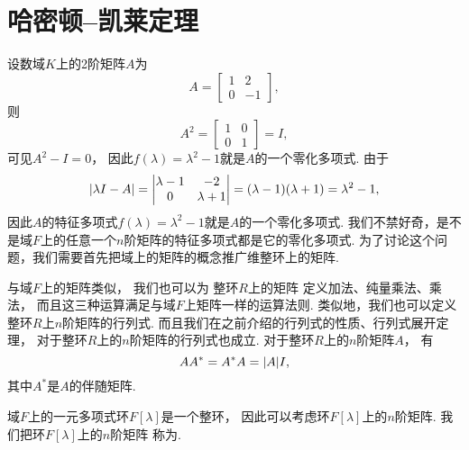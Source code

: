 \section{哈密顿--凯莱定理}
设数域\(K\)上的2阶矩阵\(A\)为\[
	A = \begin{bmatrix}
		1 & 2 \\
		0 & -1
	\end{bmatrix},
\]
则\[
	A^2
	= \begin{bmatrix}
		1 & 0 \\
		0 & 1
	\end{bmatrix}
	= I,
\]
可见\(A^2 - I = 0\)，
因此\(f(\lambda) = \lambda^2 - 1\)就是\(A\)的一个零化多项式.
由于\[
	\abs{\lambda I - A}
	= \begin{vmatrix}
		\lambda-1 & -2 \\
		0 & \lambda+1
	\end{vmatrix}
	= (\lambda-1)(\lambda+1)
	= \lambda^2-1,
\]
因此\(A\)的特征多项式\(f(\lambda) = \lambda^2-1\)就是\(A\)的一个零化多项式.
我们不禁好奇，是不是域\(F\)上的任意一个\(n\)阶矩阵的特征多项式都是它的零化多项式.
为了讨论这个问题，我们需要首先把域上的矩阵的概念推广维整环上的矩阵.

与域\(F\)上的矩阵类似，
我们也可以为
整环\(R\)上的矩阵
定义加法、纯量乘法、乘法，
而且这三种运算满足与域\(F\)上矩阵一样的运算法则.
类似地，我们也可以定义整环\(R\)上\(n\)阶矩阵的行列式.
而且我们在之前介绍的行列式的性质、行列式展开定理，
对于整环\(R\)上的\(n\)阶矩阵的行列式也成立.
对于整环\(R\)上的\(n\)阶矩阵\(A\)，
有\[
	A A^* = A^* A = \abs{A} I,
\]
其中\(A^*\)是\(A\)的伴随矩阵.

域\(F\)上的一元多项式环\(F[\lambda]\)是一个整环，
因此可以考虑环\(F[\lambda]\)上的\(n\)阶矩阵.
我们把环\(F[\lambda]\)上的\(n\)阶矩阵
称为.

